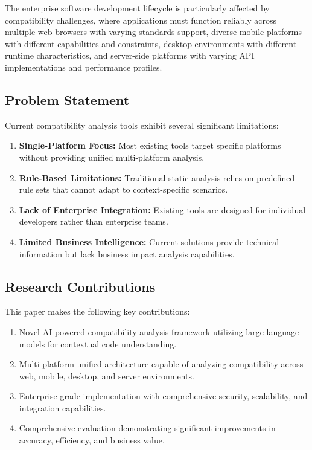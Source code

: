 \documentclass[conference]{IEEEtran}
\begin{document}
The enterprise software development lifecycle is particularly affected by compatibility challenges, where applications must function reliably across multiple web browsers with varying standards support, diverse mobile platforms with different capabilities and constraints, desktop environments with different runtime characteristics, and server-side platforms with varying API implementations and performance profiles.

\subsection{Problem Statement}
Current compatibility analysis tools exhibit several significant limitations:
\begin{enumerate}
\item \textbf{Single-Platform Focus:} Most existing tools target specific platforms without providing unified multi-platform analysis.
\item \textbf{Rule-Based Limitations:} Traditional static analysis relies on predefined rule sets that cannot adapt to context-specific scenarios.
\item \textbf{Lack of Enterprise Integration:} Existing tools are designed for individual developers rather than enterprise teams.
\item \textbf{Limited Business Intelligence:} Current solutions provide technical information but lack business impact analysis capabilities.
\end{enumerate}

\subsection{Research Contributions}
This paper makes the following key contributions:
\begin{enumerate}
\item Novel AI-powered compatibility analysis framework utilizing large language models for contextual code understanding.
\item Multi-platform unified architecture capable of analyzing compatibility across web, mobile, desktop, and server environments.
\item Enterprise-grade implementation with comprehensive security, scalability, and integration capabilities.
\item Comprehensive evaluation demonstrating significant improvements in accuracy, efficiency, and business value.
\end{enumerate}
\end{document}

